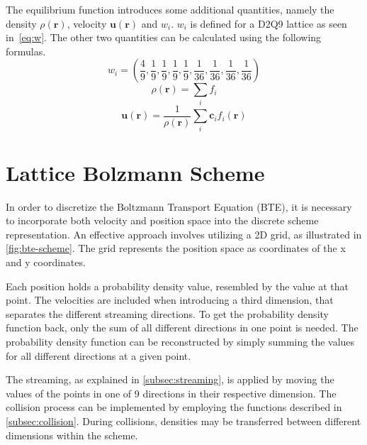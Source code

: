 The equilibrium function introduces some additional quantities, namely the density \(\rho(\mathbf{r})\), velocity \(\mathbf{u}(\mathbf{r})\) and \(w_i\).
\(w_i\) is defined for a D2Q9 lattice as seen in~\cref{eq:w}.
The other two quantities can be calculated using the following formulas.
\begin{equation}
    w_i = \left(\dfrac{4}{9},
    \dfrac{1}{9}, \dfrac{1}{9}, \dfrac{1}{9}, \dfrac{1}{9},
    \dfrac{1}{36}, \dfrac{1}{36}, \dfrac{1}{36}, \dfrac{1}{36}\right)
    \label{eq:w}
\end{equation}
\begin{equation}
    \rho(\mathbf{r})=\sum_i f_i
    \label{eq:rho}
\end{equation}
\begin{equation}
    \mathbf{u}(\mathbf{r})=
    \frac{1}{\rho(\mathbf{r})}\sum_i \mathbf{c}_i f_i(\mathbf{r})
    \label{eq:u}
\end{equation}


\section{Lattice Bolzmann Scheme}\label{sec:lattice-bolzmann-scheme}

In order to discretize the Boltzmann Transport Equation (BTE), it is necessary to incorporate both velocity and position space into the discrete scheme representation.
An effective approach involves utilizing a 2D grid, as illustrated in \cref{fig:bte-scheme}.
The grid represents the position space as coordinates of the x and y coordinates.
\newline

Each position holds a probability density value, resembled by the value at that point.
The velocities are included when introducing a third dimension, that separates the different streaming directions.
To get the probability density function back, only the sum of all different directions in one point is needed.
The probability density function can be reconstructed by simply summing the values for all different directions at a given point.
\newline

The streaming, as explained in \cref{subsec:streaming}, is applied by moving the values of the points in one of 9 directions in their respective dimension.
The collision process can be implemented by employing the functions described in \cref{subsec:collision}.
During collisions, densities may be transferred between different dimensions within the scheme.

